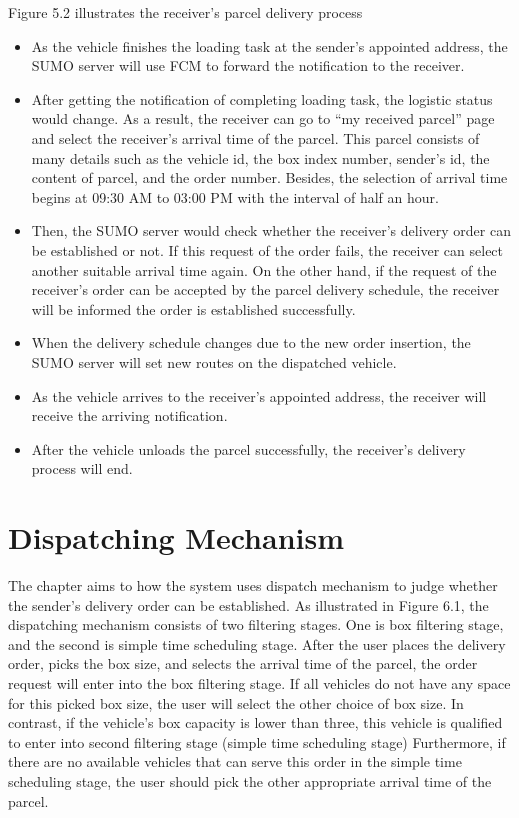 \documentclass[12pt]{ksthesis}
\begin{document}
\begin{thesis}
{Figure 5.2 illustrates the receiver’s parcel delivery process

\begin{itemize}
\item
As the vehicle finishes the loading task at the sender’s appointed address, the SUMO server will use FCM to forward the notification to the receiver.

\item
After getting the notification of completing loading task, the logistic status would change. As a result, the receiver can go to “my received parcel” page and select the receiver’s arrival time of the parcel. This parcel consists of many details such as the vehicle id, the box index number, sender’s id, the content of parcel, and the order number. Besides, the selection of arrival time begins at 09:30 AM to 03:00 PM with the interval of half an hour.

\item
Then, the SUMO server would check whether the receiver’s delivery order can be established or not. If this request of the order fails, the receiver can select another suitable arrival time again. On the other hand, if the request of the receiver’s order can be accepted by the parcel delivery schedule, the receiver will be informed the order is established successfully.

\item
When the delivery schedule changes due to the new order insertion, the SUMO server will set new routes on the dispatched vehicle.

\item
As the vehicle arrives to the receiver’s appointed address, the receiver will receive the arriving notification.

\item
After the vehicle unloads the parcel successfully, the receiver’s delivery process will end.

\end{itemize}


\chapter{Dispatching Mechanism}\label{Chap:Dispatching Mechanism}
The chapter aims to how the system uses dispatch mechanism to judge whether the sender’s delivery order can be established.
As illustrated in Figure 6.1, the dispatching mechanism consists of two filtering stages. One is box filtering stage, and the second is simple time scheduling stage. After the user places the delivery order, picks the box size, and selects the arrival time of the parcel, the order request will enter into the box filtering stage.
If all vehicles do not have any space for this picked box size, the user will select the other choice of box size. In contrast, if the vehicle’s box capacity is lower than three, this vehicle is qualified to enter into second filtering stage (simple time scheduling stage) 
Furthermore, if there are no available vehicles that can serve this order in the simple time scheduling stage, the user should pick the other appropriate arrival time of the parcel.

}
\end{thesis}
\end{document}
